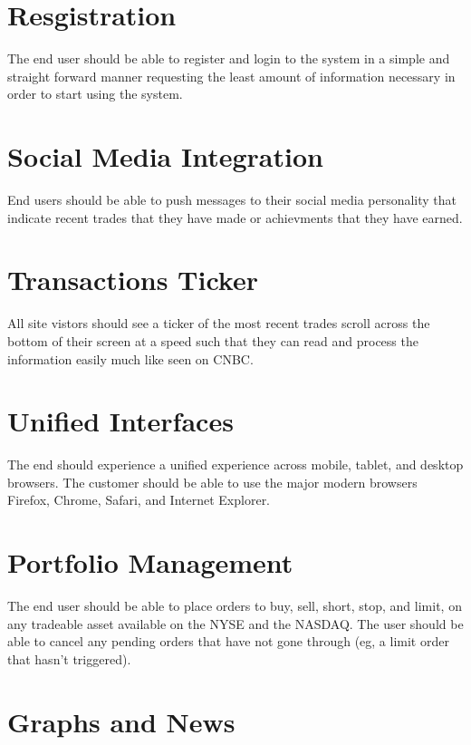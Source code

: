 \documentclass[11pt,letterpaper,oneside]{memoir}
\begin{document}
\section{Resgistration}

The end user should be able to register and login to the system in a simple and straight forward
manner requesting the least amount of information necessary in order to start using the system.

\section{Social Media Integration}

End users should be able to push messages to their social media personality that indicate
recent trades that they have made or achievments that they have earned.

\section{Transactions Ticker}

All site vistors should see a ticker of the most recent trades scroll across the bottom of their
screen at a speed such that they can read and process the information easily much like seen on
CNBC.

\section{Unified Interfaces}

The end should experience a unified experience across mobile, tablet, and desktop browsers.
The customer should be able to use the major modern browsers Firefox, Chrome, Safari, and
Internet Explorer.

\section{Portfolio Management}

The end user should be able to place orders to buy, sell, short, stop, and limit, on any
tradeable asset available on the NYSE and the NASDAQ. The user should be able to
cancel any pending orders that have not gone through (eg, a limit order that hasn't triggered).

\section{Graphs and News}
\end{document}
